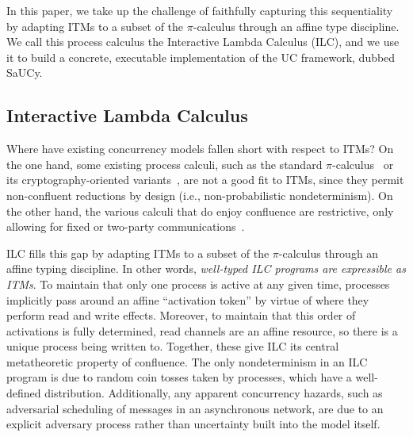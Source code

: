 In this paper, we take up the challenge of faithfully capturing this
sequentiality by adapting ITMs to a subset of the $\pi$-calculus through an affine
type discipline. We call this process calculus the Interactive Lambda Calculus
(ILC), and we use it to build a concrete, executable implementation of the UC
framework, dubbed SaUCy.


\subsection{Interactive Lambda Calculus}
Where have existing concurrency models fallen short with respect to ITMs? On the
one hand, some existing process calculi, such as the standard
$\pi$-calculus~\cite{milner1999communicating} or its cryptography-oriented
variants~\cite{abadi1999calculus, abadi2001mobile, lincoln1998probabilistic},
are not a good fit to ITMs, since they permit non-confluent reductions by design
(i.e., non-probabilistic nondeterminism).
On the other hand, the various calculi that do enjoy confluence are
restrictive, only allowing for fixed or two-party
communications~\cite{kobayashi1999linearity,bohl2016symbolic,fowler2018session}.

ILC fills this gap by adapting ITMs to a subset of the $\pi$-calculus through an
affine typing discipline. In other words, \emph{well-typed ILC programs are
  expressible as ITMs}. To maintain that only one process is active at any given
time, processes implicitly pass around an affine ``activation token'' by virtue
of where they perform read and write effects. Moreover, to maintain that this
order of activations is fully determined, read channels are an affine resource,
so there is a unique process being written to. Together, these give ILC its
central metatheoretic property of confluence. The only nondeterminism in an ILC
program is due to random coin tosses taken by processes, which have a
well-defined distribution. Additionally, any apparent concurrency hazards, such
as adversarial scheduling of messages in an asynchronous network, are due to an
explicit adversary process rather than uncertainty built into the model itself.

